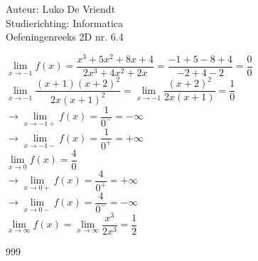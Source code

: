 \documentclass[a4paper]{article}
\begin{document}
\noindent \large Auteur: Luko De Vriendt\\
\noindent \large Studierichting: Informatica\\
\noindent \large Oefeningenreeks 2D nr. 6.4\\

\medskip

\normalsize


$\lim\limits_{x \rightarrow -1} f(x) = \dfrac{x^3 + 5x^2 + 8x + 4}{2x^3 + 4x^2 + 2x} = \dfrac{-1 + 5 - 8 + 4}{-2 + 4 -2} = \dfrac{0}{0}$ \\

$\lim\limits_{x \rightarrow -1} \dfrac{(x+1)(x+2)^2}{2x(x+1)^2} = \lim\limits_{x \rightarrow -1} \dfrac{(x+2)^2}{2x(x+1)} = \dfrac{1}{0}$ \\

$\rightarrow \lim\limits_{x \rightarrow -1+} f(x) = \dfrac{1}{0^-} = -\infty$ \\

$\rightarrow \lim\limits_{x \rightarrow -1-} f(x) = \dfrac{1}{0^+} = +\infty$ \\

$\lim\limits_{x \rightarrow 0} f(x) = \dfrac{4}{0}$ \\

$\rightarrow \lim\limits_{x \rightarrow 0+} f(x) = \dfrac{4}{0^+} = +\infty$ \\

$\rightarrow \lim\limits_{x \rightarrow 0-} f(x) = \dfrac{4}{0^-} = -\infty$ \\

$\lim\limits_{x \rightarrow \infty} f(x) = \lim\limits_{x \rightarrow \infty} \dfrac{x^3}{2x^3} = \dfrac{1}{2}$ \\


\begin{thebibliography}{999}
\end{thebibliography}
\end{document}
